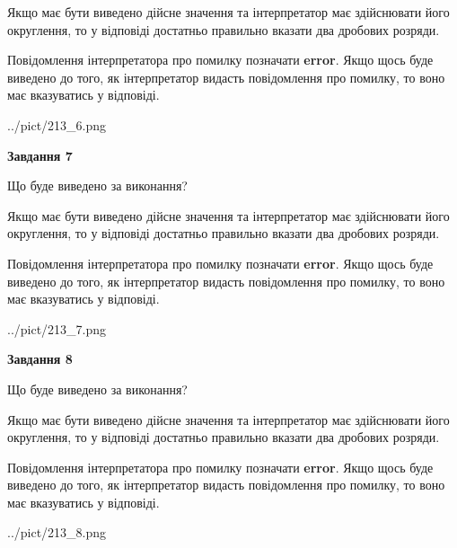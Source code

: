 \documentclass[12pt, ukrainian]{article}
\begin{document}
{\begin {Large}
Якщо має бути виведено дійсне значення та інтерпретатор має здійснювати його округлення, 
то у відповіді достатньо правильно вказати два дробових розряди.

Повідомлення інтерпретатора про помилку позначати \textbf{error}.
Якщо щось буде виведено до того, як інтерпретатор видасть повідомлення про помилку, 
то воно має вказуватись у відповіді. \par

\begin{center}
	{../pict/213_6.png}
\end{center}
\newpage

{\begin {center}\textbf{Завдання 7}\end {center}}\par
Що буде виведено за виконання? \par

Якщо має бути виведено дійсне значення та інтерпретатор має здійснювати його округлення, 
то у відповіді достатньо правильно вказати два дробових розряди.

Повідомлення інтерпретатора про помилку позначати \textbf{error}.
Якщо щось буде виведено до того, як інтерпретатор видасть повідомлення про помилку, 
то воно має вказуватись у відповіді. \par

\begin{center}
	{../pict/213_7.png}
\end{center}
\newpage

{\begin {center}\textbf{Завдання 8}\end {center}}\par
Що буде виведено за виконання? \par

Якщо має бути виведено дійсне значення та інтерпретатор має здійснювати його округлення, 
то у відповіді достатньо правильно вказати два дробових розряди.

Повідомлення інтерпретатора про помилку позначати \textbf{error}.
Якщо щось буде виведено до того, як інтерпретатор видасть повідомлення про помилку, 
то воно має вказуватись у відповіді. \par

\begin{center}
	{../pict/213_8.png}
\end{center}
\newpage


\end{Large}}
\end{document}
